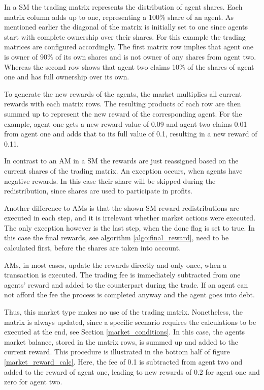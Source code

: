 In a SM the trading matrix represents the distribution of agent shares. Each matrix column adds up to one, representing a 100\% share of an agent. As mentioned earlier the diagonal of the matrix is initially set to one since agents start with complete ownership over their shares. For this example the trading matrices are configured accordingly. The first matrix row implies that agent one is owner of 90\% of its own shares and is not owner of any shares from agent two. Whereas the second row shows that agent two claims 10\% of the shares of agent one and has full ownership over its own.

To generate the new rewards of the agents, the market multiplies all current rewards with each matrix rows. The resulting products of each row are then summed up to represent the new reward of the corresponding agent. For the example, agent one gets a new reward value of 0.09 and agent two claims 0.01 from agent one and adds that to its full value of 0.1, resulting in a new reward of 0.11. 

In contrast to an AM in a SM the rewards are just reassigned based on the current shares of the trading matrix. An exception occurs, when agents have negative rewards. In this case their share will be skipped during the redistribution, since shares are used to participate in profits. 

Another difference to AMs is that the shown SM reward redistributions are executed in each step, and it is irrelevant whether market actions were executed. The only exception however is the last step, when the done flag is set to true. In this case the final rewards, see algorithm \ref{algo:final_reward}, need to be calculated first, before the shares are taken into account.

AMs, in most cases, update the rewards directly and only once, when a transaction is executed. The trading fee is immediately subtracted from one agents' reward and added to the counterpart during the trade. If an agent can not afford the fee the process is completed anyway and the agent goes into debt. 

Thus, this market type makes no use of the trading matrix. Nonetheless, the matrix is always updated, since a specific scenario requires the calculations to be executed at the end, see Section \ref{market_conditions}. In this case, the agents market balance, stored in the matrix rows, is summed up and added to the current reward. This procedure is illustrated in the bottom half of figure \ref{market_reward_calc}. Here, the fee of 0.1 is subtracted from agent two and added to the reward of agent one, leading to new rewards of 0.2 for agent one and zero for agent two.

